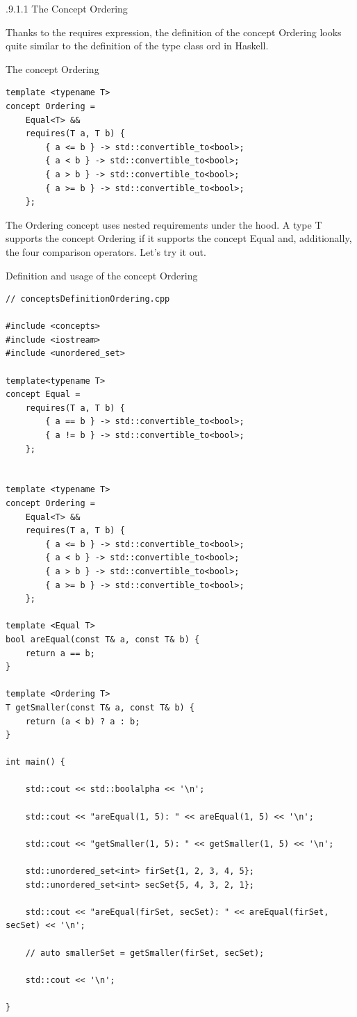 .9.1.1\hspace{0.2cm} The Concept Ordering

Thanks to the requires expression, the definition of the concept Ordering looks quite similar to the definition of the type class ord in Haskell.

\noindent
The concept Ordering
\begin{lstlisting}[style=styleCXX]
template <typename T>
concept Ordering =
	Equal<T> &&
	requires(T a, T b) {
		{ a <= b } -> std::convertible_to<bool>;
		{ a < b } -> std::convertible_to<bool>;
		{ a > b } -> std::convertible_to<bool>;
		{ a >= b } -> std::convertible_to<bool>;
	};
\end{lstlisting}

The Ordering concept uses nested requirements under the hood. A type T supports the concept Ordering if it supports the concept Equal and, additionally, the four comparison operators. Let’s try it out.

\noindent
Definition and usage of the concept Ordering
\begin{lstlisting}[style=styleCXX]
// conceptsDefinitionOrdering.cpp

#include <concepts>
#include <iostream>
#include <unordered_set>

template<typename T>
concept Equal =
	requires(T a, T b) {
		{ a == b } -> std::convertible_to<bool>;
		{ a != b } -> std::convertible_to<bool>;
	};


template <typename T>
concept Ordering =
	Equal<T> &&
	requires(T a, T b) {
		{ a <= b } -> std::convertible_to<bool>;
		{ a < b } -> std::convertible_to<bool>;
		{ a > b } -> std::convertible_to<bool>;
		{ a >= b } -> std::convertible_to<bool>;
	};

template <Equal T>
bool areEqual(const T& a, const T& b) {
	return a == b;
}

template <Ordering T>
T getSmaller(const T& a, const T& b) {
	return (a < b) ? a : b;
}

int main() {

	std::cout << std::boolalpha << '\n';
	
	std::cout << "areEqual(1, 5): " << areEqual(1, 5) << '\n';
	
	std::cout << "getSmaller(1, 5): " << getSmaller(1, 5) << '\n';
	
	std::unordered_set<int> firSet{1, 2, 3, 4, 5};
	std::unordered_set<int> secSet{5, 4, 3, 2, 1};
	
	std::cout << "areEqual(firSet, secSet): " << areEqual(firSet, secSet) << '\n';
	
	// auto smallerSet = getSmaller(firSet, secSet);
	
	std::cout << '\n';

}
\end{lstlisting}

